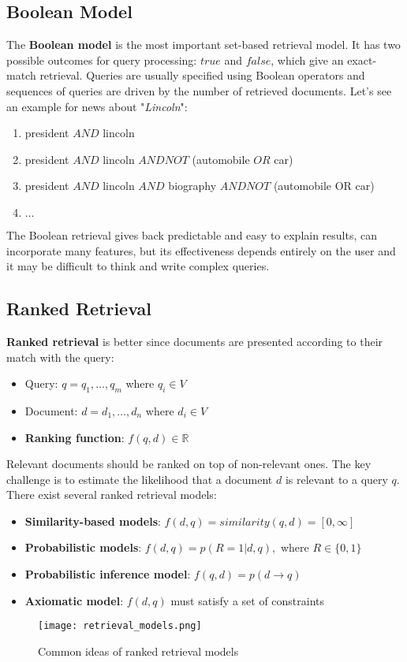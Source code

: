 \documentclass{article}
\begin{document}
\subsection{Boolean Model}
The \textbf{Boolean model} is the most important set-based retrieval model. It has two possible outcomes for query processing: $true$ and $false$, which give an exact-match retrieval.
Queries are usually specified using Boolean operators and sequences of queries are driven by the number of retrieved documents. Let's see an example for news about "\textit{Lincoln}":
\begin{enumerate}
    \item president $AND$ lincoln
    \item president $AND$ lincoln $AND NOT$ (automobile $OR$ car)
    \item president $AND$ lincoln $AND$ biography $AND NOT$ (automobile OR car)
    \item $\dots$
\end{enumerate}
The Boolean retrieval gives back predictable and easy to explain results, can incorporate many features, but its effectiveness depends entirely on the user and it may be difficult to think and write complex queries.

\subsection{Ranked Retrieval}
\textbf{Ranked retrieval} is better since documents are presented according to their match with the query:
\begin{itemize}
    \item Query: $q = q_1, \dots, q_m$ where $q_i \in V$
    \item Document: $d = d_1, \dots, d_n$ where $d_i \in V$
    \item \textbf{Ranking function}: $f(q,d) \in \mathbb{R}$
\end{itemize}
Relevant documents should be ranked on top of non-relevant ones.
The key challenge is to estimate the likelihood that a document $d$ is relevant to a query $q$.
There exist several ranked retrieval models:
\begin{itemize}
    \item \textbf{Similarity-based models}: $f(d,q) = similarity(q,d) = [0, \infty]$
    \item \textbf{Probabilistic models}: $f(d,q) = p(R = 1 | d,q),$ where $R \in \{0,1\}$
    \item \textbf{Probabilistic inference model}: $f(q,d) = p(d \rightarrow q)$
    \item \textbf{Axiomatic model}: $f(d,q)$ must satisfy a set of constraints
\end{itemize}
\begin{figure}[H]
    \centering
    \texttt{[image: retrieval\_models.png]}
    \caption{Common ideas of ranked retrieval models}
\end{figure}
\end{document}
